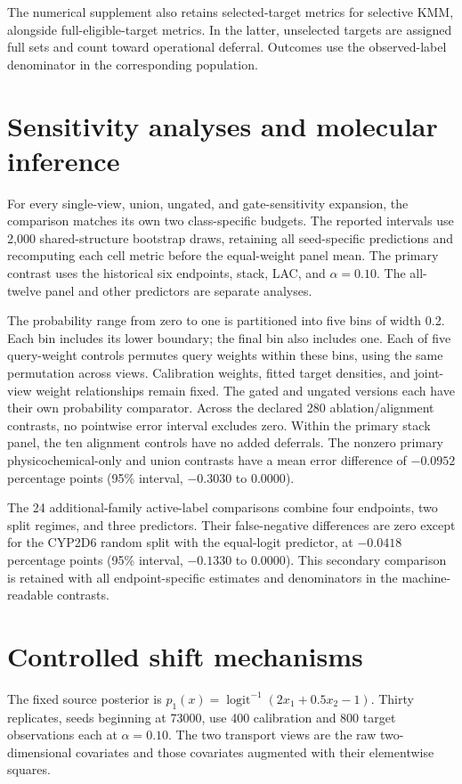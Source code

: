 The numerical supplement also retains selected-target metrics for selective KMM, alongside full-eligible-target metrics. In the latter, unselected targets are assigned full sets and count toward operational deferral. Outcomes use the observed-label denominator in the corresponding population.

\section{Sensitivity analyses and molecular inference}
For every single-view, union, ungated, and gate-sensitivity expansion, the comparison matches its own two class-specific budgets. The reported intervals use 2,000 shared-structure bootstrap draws, retaining all seed-specific predictions and recomputing each cell metric before the equal-weight panel mean. The primary contrast uses the historical six endpoints, stack, LAC, and $\alpha=0.10$. The all-twelve panel and other predictors are separate analyses.

The probability range from zero to one is partitioned into five bins of width 0.2. Each bin includes its lower boundary; the final bin also includes one. Each of five query-weight controls permutes query weights within these bins, using the same permutation across views. Calibration weights, fitted target densities, and joint-view weight relationships remain fixed. The gated and ungated versions each have their own probability comparator. Across the declared 280 ablation/alignment contrasts, no pointwise error interval excludes zero. Within the primary stack panel, the ten alignment controls have no added deferrals. The nonzero primary physicochemical-only and union contrasts have a mean error difference of $-0.0952$ percentage points (95\% interval, $-0.3030$ to $0.0000$).

The 24 additional-family active-label comparisons combine four endpoints, two split regimes, and three predictors. Their false-negative differences are zero except for the CYP2D6 random split with the equal-logit predictor, at $-0.0418$ percentage points (95\% interval, $-0.1330$ to $0.0000$). This secondary comparison is retained with all endpoint-specific estimates and denominators in the machine-readable contrasts.

\section{Controlled shift mechanisms}
The fixed source posterior is $p_1(x)=\operatorname{logit}^{-1}(2x_1+0.5x_2-1)$. Thirty replicates, seeds beginning at 73000, use 400 calibration and 800 target observations each at $\alpha=0.10$. The two transport views are the raw two-dimensional covariates and those covariates augmented with their elementwise squares.

